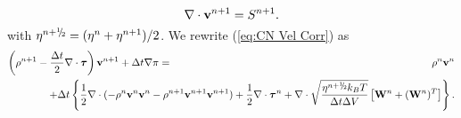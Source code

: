 \documentclass[final]{siamltex}
\newcommand{\sfrac}[2]{\mathchoice
  {\kern0em\raise.5ex\hbox{\the\scriptfont0 #1}\kern-.15em/
   \kern-.15em\lower.25ex\hbox{\the\scriptfont0 #2}}
  {\kern0em\raise.5ex\hbox{\the\scriptfont0 #1}\kern-.15em/
   \kern-.15em\lower.25ex\hbox{\the\scriptfont0 #2}}
  {\kern0em\raise.5ex\hbox{\the\scriptscriptfont0 #1}\kern-.2em/
   \kern-.15em\lower.25ex\hbox{\the\scriptscriptfont0 #2}}
  {#1\!/#2}}
\def\vb {{\bf v}}
\def\Wb {{\bf W}}
\def\taub {\boldsymbol{\tau}}
\def\half   {\frac{1}{2}}
\def\myhalf {\sfrac{1}{2}}
\begin{document}
\begin{equation}
\nabla\cdot\vb^{n+1} = S^{n+1}.
\end{equation}
with $\eta^{n+\myhalf} = (\eta^n + \eta^{n+1})/2$.
We rewrite (\ref{eq:CN Vel Corr}) as
\begin{eqnarray}
\left(\rho^{n+1} - \frac{\Delta t}{2}\nabla\cdot\taub\right)\vb^{n+1} + \Delta t\nabla\pi &=& \rho^n\vb^n\nonumber\\
&&\hspace{-1.75in}+ \Delta t\left\{\half\nabla\cdot(-\rho^n\vb^n\vb^n-\rho^{n+1}\vb^{n+1}\vb^{n+1}) + \half\nabla\cdot\taub^n + \nabla\cdot\sqrt{\frac{\eta^{n+\myhalf} k_B T}{\Delta t\Delta V}}\left[\Wb^n + (\Wb^n)^T\right]\right\}.\nonumber\\
\end{eqnarray}
\end{document}
